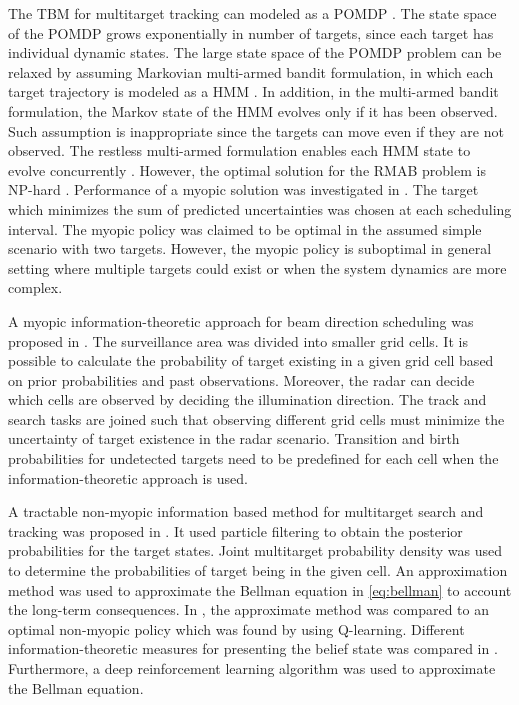 \documentclass[english, 12pt, a4paper, elec, utf8, a-1b, online]{aaltothesis}
\begin{document}
The TBM for multitarget tracking can modeled as a POMDP \cite{Krishnamurthy1999, Krishnamurthy2001, LaScala2006}.
The state space of the POMDP grows exponentially in number of targets, since each target has individual dynamic states.
The large state space of the POMDP problem can be relaxed by assuming Markovian multi-armed bandit formulation, in which each target trajectory is modeled as a HMM \cite{Krishnamurthy1999, Krishnamurthy2001}.
In addition, in the multi-armed bandit formulation, the Markov state of the HMM evolves only if it has been observed.
Such assumption is inappropriate since the targets can move even if they are not observed.
The restless multi-armed formulation enables each HMM state to evolve concurrently \cite{LaScala2006}.
However, the optimal solution for the RMAB problem is NP-hard \cite{Guha2007}.
Performance of a myopic solution was investigated in \cite{LaScala2006}.
The target which minimizes the sum of predicted uncertainties was chosen at each scheduling interval.
The myopic policy was claimed to be optimal in the assumed simple scenario with two targets.
However, the myopic policy is suboptimal in general setting where multiple targets could exist or when the system dynamics are more complex.


A myopic information-theoretic approach for beam direction scheduling was proposed in \cite{Kastella1997}.
The surveillance area was divided into smaller grid cells.
It is possible to calculate the probability of target existing in a given grid cell based on prior probabilities and past observations. 
Moreover, the radar can decide which cells are observed by deciding the illumination direction.
The track and search tasks are joined such that observing different grid cells must minimize the uncertainty of target existence in the radar scenario.
Transition and birth probabilities for undetected targets need to be predefined for each cell when the information-theoretic approach is used.

A tractable non-myopic information based method for multitarget search and tracking was proposed in \cite{Kreucher2004}.
It used particle filtering to obtain the posterior probabilities for the target states.
Joint multitarget probability density was used to determine the probabilities of target being in the given cell.
An approximation method was used to approximate the Bellman equation in \eqref{eq:bellman} to account the long-term consequences. 
In \cite{Kreucher2005}, the approximate method was compared to an optimal non-myopic policy which was found by using Q-learning.
Different information-theoretic measures for presenting the belief state was compared in \cite{Xu2010}.
Furthermore, a deep reinforcement learning algorithm was used to approximate the Bellman equation.
\end{document}
